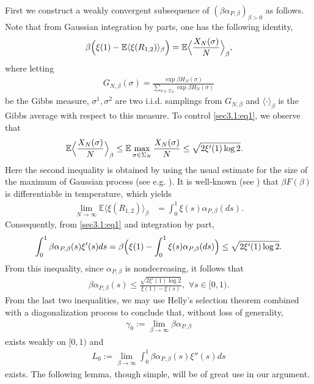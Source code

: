 \documentclass[12pt]{article}
\def\Bla{\Big{\langle}}
\def\Bra{\Big{\rangle}}
\def\bla{\langle}
\def\bra{\rangle}
\def\la{\langle}
\def\ra{\rangle}
\newcommand{\e}{\mathbb{E}}
\newenvironment{Proof of lemma}{\noindent{\bf Proof of Lemma}}{\hfill$\Box$\newline}
\newenvironment{Proof of theorem}{\noindent{\bf Proof of Theorem}}{\hfill{\footnotesize${\square}$}\newline}
\newenvironment{Proof of theorems}{\noindent{\bf Proof of Theorems}}{\hfill$\Box$\newline}
\newenvironment{Proof of proposition}{\noindent{\bf Proof of Proposition}}{\hfill$\Box$\newline}
\newenvironment{Proof of propositions}{\noindent{\bf Proof of Propositions}}{\hfill$\Box$\newline}
\newenvironment{Proof of exercise}{\noindent{\it Proof of Exercise:}}{\hfill$\Box$}
\begin{document}
First we construct a weakly convergent subsequence of $(\beta \alpha_{P,\beta})_{\beta>0}$ as follows. Note that from Gaussian integration by parts, one has the following identity,
\begin{align}\label{sec3.1:eq1}
\beta\Bigl(\xi(1)-\e\bla \xi(R_{1,2})\bra_\beta\Bigr)=\e \Bla\frac{X_N(\sigma)}{N}\Bra_\beta,
\end{align}
where letting 
\begin{align*}
G_{N,\beta}(\sigma)=\frac{\exp \beta H_N(\sigma)}{\sum_{\sigma\in\Sigma_N}\exp \beta H_N(\sigma)}
\end{align*}
be the Gibbs measure, $\sigma^1,\sigma^2$ are two i.i.d. samplings from $G_{N,\beta}$ and $\la \cdot\ra_\beta$ is the Gibbs average with respect to this measure.
To control \eqref{sec3.1:eq1}, we observe that
\begin{align*}
\e \Bla\frac{X_N(\sigma)}{N}\Bra_\beta&\leq \e\max_{\sigma\in \Sigma_N}\frac{X_N(\sigma)}{N}\leq \sqrt{2\xi'(1)\log 2}.
\end{align*}
Here the second inequality is obtained by using the usual estimate for the size of the maximum of Gaussian process (see e.g.  \cite{T03}). It is well-known (see  \cite{P08}) that $\beta F(\beta)$ is differentiable in temperature, which yields
\begin{align*}
\lim_{N\rightarrow\infty}\e\bla \xi(R_{1,2})\bra_\beta&=\int_0^1\xi(s)\alpha_{P,\beta}(ds).
\end{align*}
Consequently, from \eqref{sec3.1:eq1} and integration by part,
\begin{align*}
\int_0^1\beta \alpha_{P,\beta}(s)\xi'(s)ds=\beta\Bigl(\xi(1)-\int_0^1\xi(s)\alpha_{P,\beta}(ds)\Bigr)\leq \sqrt{2\xi'(1)\log 2}.
\end{align*}
From this inequality, since $\alpha_{P,\beta}$ is nondecreasing, it follows that
\begin{align}\label{eq-1}
\beta \alpha_{P,\beta}(s)\leq \frac{\sqrt{2\xi'(1)\log 2}}{\xi(1)-\xi(s)},\,\,\forall s\in[0,1).
\end{align}
From the last two inequalities, we may use Helly's selection theorem combined with a diagonalization process to conclude that, without loss of generality, 
\begin{align}\label{eq-3}
\gamma_0:=\lim_{\beta\rightarrow\infty}\beta \alpha_{P,\beta}
\end{align}  
exists weakly on $[0,1)$ and 
\begin{align}
\label{eq-4} 
L_0:=\lim_{\beta\rightarrow\infty}\int_0^1\beta\alpha_{P,\beta}(s)\xi''(s)ds
\end{align}
exists. The following lemma, though simple, will be of great use in our argument.
\end{document}
